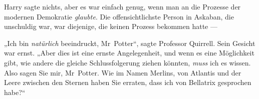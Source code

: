 Harry sagte nichts, aber es war einfach genug, wenn man an die Prozesse der modernen Demokratie \emph{glaubte}. Die offensichtlichste Person in Askaban, die unschuldig war, war diejenige, die keinen Prozess bekommen hatte —

„Ich bin \emph{natürlich} beeindruckt, Mr~Potter“, sagte Professor Quirrell. Sein Gesicht war ernst.
„Aber dies ist eine ernste Angelegenheit, und wenn es eine Möglichkeit gibt, wie andere die gleiche Schlussfolgerung ziehen könnten, \emph{muss} ich es wissen. Also sagen Sie mir, Mr~Potter. Wie im Namen Merlins, von Atlantis und der Leere zwischen den Sternen haben Sie erraten, dass ich von Bellatrix gesprochen habe?“

